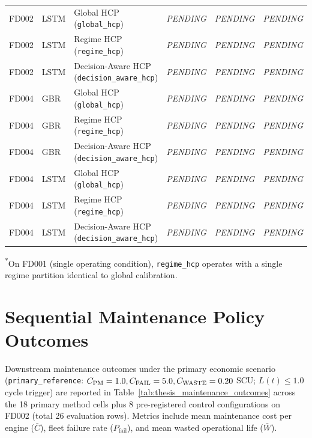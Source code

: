 \begin{table}[htbp]
\begin{tabular}{lllccc}
\midrule
FD002 & LSTM & Global HCP (\texttt{global\_hcp})             & \textit{PENDING} & \textit{PENDING} & \textit{PENDING} \\
FD002 & LSTM & Regime HCP (\texttt{regime\_hcp})             & \textit{PENDING} & \textit{PENDING} & \textit{PENDING} \\
FD002 & LSTM & Decision-Aware HCP (\texttt{decision\_aware\_hcp}) & \textit{PENDING} & \textit{PENDING} & \textit{PENDING} \\
\midrule
FD004 & GBR  & Global HCP (\texttt{global\_hcp})             & \textit{PENDING} & \textit{PENDING} & \textit{PENDING} \\
FD004 & GBR  & Regime HCP (\texttt{regime\_hcp})             & \textit{PENDING} & \textit{PENDING} & \textit{PENDING} \\
FD004 & GBR  & Decision-Aware HCP (\texttt{decision\_aware\_hcp}) & \textit{PENDING} & \textit{PENDING} & \textit{PENDING} \\
\midrule
FD004 & LSTM & Global HCP (\texttt{global\_hcp})             & \textit{PENDING} & \textit{PENDING} & \textit{PENDING} \\
FD004 & LSTM & Regime HCP (\texttt{regime\_hcp})             & \textit{PENDING} & \textit{PENDING} & \textit{PENDING} \\
FD004 & LSTM & Decision-Aware HCP (\texttt{decision\_aware\_hcp}) & \textit{PENDING} & \textit{PENDING} & \textit{PENDING} \\
\bottomrule
\end{tabular}
\begin{flushleft}
\footnotesize \textsuperscript{*}On FD001 (single operating condition), \texttt{regime\_hcp} operates with a single regime partition identical to global calibration.
\end{flushleft}
\end{table}

\section{Sequential Maintenance Policy Outcomes}
Downstream maintenance outcomes under the primary economic scenario (\texttt{primary\_reference}: $C_{\text{PM}}=1.0, C_{\text{FAIL}}=5.0, C_{\text{WASTE}}=0.20$ SCU; $L(t) \le 1.0$ cycle trigger) are reported in Table~\ref{tab:thesis_maintenance_outcomes} across the 18 primary method cells plus 8 pre-registered control configurations on FD002 (total 26 evaluation rows). Metrics include mean maintenance cost per engine ($\bar{C}$), fleet failure rate ($P_{\text{fail}}$), and mean wasted operational life ($\bar{W}$).

